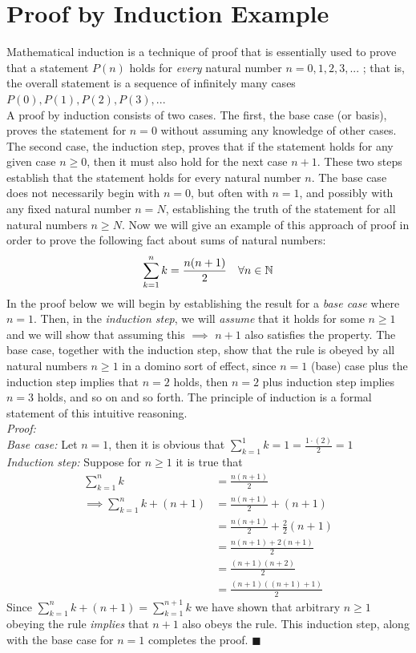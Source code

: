 \section{Proof by Induction Example} Mathematical induction is a technique of proof that is essentially used to prove that a statement $P(n)$ holds for \textit{every} natural number $n = 0, 1, 2, 3, ...$ ; that is, the overall statement is a sequence of infinitely many cases $P(0), P(1), P(2), P(3), ...$ \\
\noindent A proof by induction consists of two cases. The first, the base case (or basis), proves the statement for $n = 0$ without assuming any knowledge of other cases. The second case, the induction step, proves that if the statement holds for any given case $n\geq 0$, then it must also hold for the next case $n + 1$. These two steps establish that the statement holds for every natural number $n$. The base case does not necessarily begin with $n = 0$, but often with $n = 1$, and possibly with any fixed natural number $n = N$, establishing the truth of the statement for all natural numbers $n \geq N$. Now we will give an example of this approach of proof in order to prove the following fact about sums of natural numbers:
\begin{align}
    \sum_{k=1}^{n} k = \frac{n(n+1)}{2} \ \ \ \forall n \in {\mathbb{ N}} \nonumber
\end{align}
In the proof below we will begin by establishing the result for a \textit{base case} where $n=1$. Then, in the \textit{induction step}, we will \textit{assume} that it holds for some $n\geq 1$ and we will show that assuming this $\implies$ $n+1$ also satisfies the property. The base case, together with the induction step, show that the rule is obeyed by all natural numbers $n\geq 1$ in a domino sort of effect, since $n=1$ (base) case plus the induction step implies that $n=2$ holds, then $n=2$ plus induction step implies $n=3$ holds, and so on and so forth. The principle of induction is a formal statement of this intuitive reasoning.\\
\textit{Proof:}\\
\noindent\textit{Base case:} Let $n=1$, then it is obvious that $\sum_{k=1}^1 k = 1 = \frac{1\cdot(2)}{2}=1$\\
\textit{Induction step:} Suppose for $n\geq 1$ it is true that 
\begin{align}
    \sum_{k=1}^n k&=\frac{n(n+1)}{2}\nonumber\\ 
    \implies \sum_{k=1}^{n} k + (n+1)&=\frac{n(n+1)}{2} +(n+1)\nonumber\\ 
    &=\frac{n(n+1)}{2} +\frac{2}{2}(n+1)\nonumber\\
    &=\frac{n(n+1)+2(n+1)}{2} \nonumber \\
    &=\frac{(n+1)(n+2)}{2} \nonumber \\
    &=\frac{(n+1)((n+1)+1)}{2} \nonumber
\end{align}
Since $\sum_{k=1}^{n} k + (n+1)=\sum_{k=1}^{n+1} k$ we have shown that arbitrary $n\geq 1$ obeying the rule \textit{implies} that $n+1$ also obeys the rule. This induction step, along with the base case for $n=1$ completes the proof. $\blacksquare$
\smallbreak

